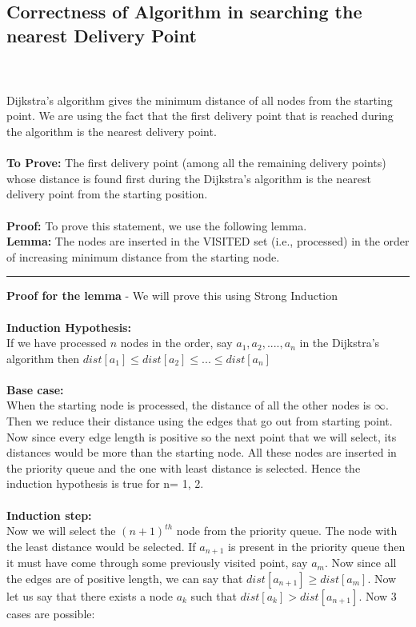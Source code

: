 \documentclass{article}
\begin{document}
\subsection{Correctness of Algorithm in searching the nearest Delivery Point}\\\\
Dijkstra's algorithm gives the minimum distance of all nodes from the starting point. We are using the fact that the first delivery point that is reached during the algorithm is the nearest delivery point.
\\\\
\textbf{To Prove:} 
The first delivery point (among all the remaining delivery points) whose distance is found first during the Dijkstra's algorithm is the nearest delivery point from the starting position.
\\\\
\textbf{Proof:} To prove this statement, we use the following lemma.\\
\textbf{Lemma:} The nodes are inserted in the VISITED set (i.e., processed) in the order of increasing minimum distance from the starting node.
\\
\noindent\rule{\textwidth}{0.4pt}
\textbf{Proof for the lemma} -
We will prove this using Strong Induction
\\\\
\textbf{Induction Hypothesis:}\\
If we have processed $n$ nodes in the order, say $a_1, a_2, ...., a_n$ in the Dijkstra's algorithm then $dist[a_1] \le dist[a_2] \le ... \le dist[a_n] $
\\\\
\textbf{Base case:}\\
When the starting node is processed, the distance of all the other nodes is $\infty$. Then we reduce their distance using the edges that go out from starting point. Now since every edge length is positive so the next point that we will select, its distances would be more than the starting node. All these nodes are inserted in the priority queue and the one with least distance is selected. Hence the induction hypothesis is true for n= 1, 2.
\\\\
\textbf{Induction step:}\\
Now we will select the $(n+1)^{th}$ node from the priority queue. The node with the least distance would be selected. If $a_{n+1}$ is present in the priority queue then it must have come through some previously visited point, say $a_m$. Now since all the edges are of positive length, we can say that $dist[a_{n+1}] \ge dist[a_m]$. Now let us say that there exists a node $a_k$ such that $dist[a_k] > dist[a_{n+1}]$. Now 3 cases are possible:
\end{document}
